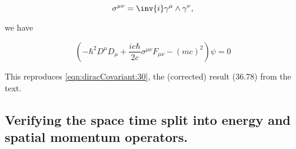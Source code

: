 \begin{equation}\label{eqn:diracCovariant:360}
\sigma^{\mu \nu} = \inv{i} \gamma^\mu \wedge \gamma^\nu,
\end{equation}

we have

\begin{equation}\label{eqn:diracCovariant:380}
\left( -\hbar^2 D^\mu D_\mu + \frac{i e \hbar}{ 2 c } \sigma^{\mu\nu} F_{\mu\nu} - (m c)^2 \right) \psi  = 0
\end{equation}

This reproduces \ref{eqn:diracCovariant:30}, the (corrected) result (36.78) from the text.

\subsection{Verifying the space time split into energy and spatial momentum operators.}

\EndArticle
